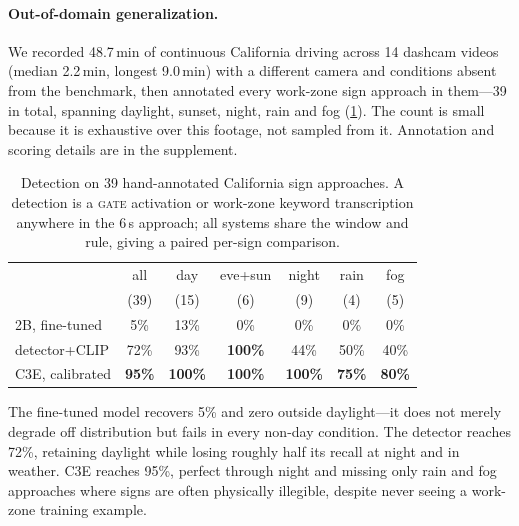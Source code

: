 \documentclass[10pt,twocolumn,letterpaper]{article}
\begin{document}
\paragraph{Out-of-domain generalization.}  We recorded 48.7\,min of continuous California driving across 14 dashcam videos (median 2.2\,min, longest 9.0\,min) with a different camera and conditions absent from the benchmark, then annotated every work-zone sign approach in them---39 in total, spanning daylight, sunset, night, rain and fog (\cref{tab:ood}).  The count is small because it is exhaustive over this footage, not sampled from it.  Annotation and scoring details are in the supplement.

\begin{table}[t]
\centering
\footnotesize
\setlength{\tabcolsep}{3.5pt}
\begin{tabular}{@{}lcccccc@{}}
\toprule
 & all & day & eve+sun & night & rain & fog \\
 & (39) & (15) & (6) & (9) & (4) & (5) \\
\midrule
2B, fine-tuned & 5\% & 13\% & 0\% & 0\% & 0\% & 0\% \\
detector+CLIP & 72\% & 93\% & \textbf{100\%} & 44\% & 50\% & 40\% \\
C3E, calibrated & \textbf{95\%} & \textbf{100\%} & \textbf{100\%} & \textbf{100\%} & \textbf{75\%} & \textbf{80\%} \\
\bottomrule
\end{tabular}
\caption{Detection on 39 hand-annotated California sign approaches.  A detection is a \textsc{gate} activation or work-zone keyword transcription anywhere in the 6\,s approach; all systems share the window and rule, giving a paired per-sign comparison.}
\label{tab:ood}
\end{table}

The fine-tuned model recovers 5\% and zero outside daylight---it does not merely degrade off distribution but fails in every non-day condition.  The detector reaches 72\%, retaining daylight while losing roughly half its recall at night and in weather.  C3E reaches 95\%, perfect through night and missing only rain and fog approaches where signs are often physically illegible, despite never seeing a work-zone training example.
\end{document}

